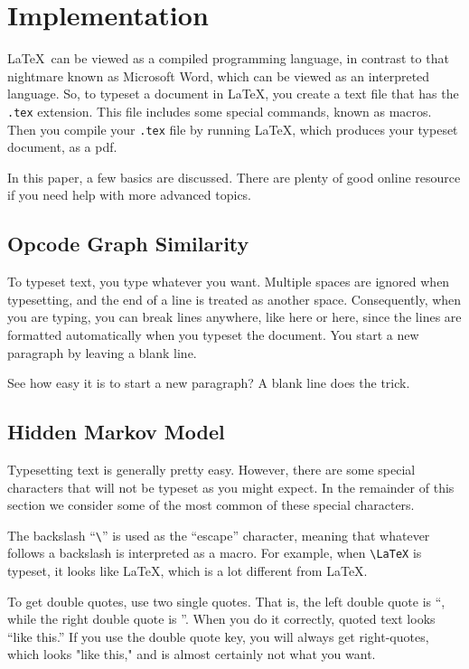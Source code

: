 \chapter{Implementation}

\LaTeX\ can be viewed
as a compiled programming language, in contrast to that 
nightmare known as Microsoft Word,
which can be viewed as an interpreted language. So, to typeset a
document in \LaTeX, you create a text file that has the {\tt .tex} extension.
This file includes some special
commands, known as macros. Then
you compile your {\tt .tex} file by running  \LaTeX,
which produces your typeset document, as a pdf. 

In this paper, a few basics are discussed. There are plenty of good online resource
if you need help with more advanced topics.


\section{Opcode Graph Similarity} 

To typeset text, you type whatever you want. Multiple spaces are
ignored                           when typesetting, and
the end of a line is treated as another space.
Consequently, when you are typing, you can break lines anywhere, like here
or here,
since the lines are formatted automatically when you typeset the document.
You start a new paragraph by leaving a blank line.

See how easy it is to start a new paragraph? A blank line does the trick.


\section{Hidden Markov Model}

Typesetting text is generally pretty easy. However, there are some special
characters that will not be typeset as you might expect. In the remainder of this
section we consider some of the most common of these
special characters. 

The backslash ``\verb+\+'' is used 
as the ``escape'' character, meaning that
whatever follows a backslash is interpreted as a macro.
For example, when \verb+\LaTeX+ is typeset, it looks like \LaTeX, which 
is a lot different from LaTeX.

To get double quotes, use two single quotes. That is, the left double quote is ``, while the right double
quote is ''. When you do it correctly, quoted text looks ``like this.''
If you use the double quote key, you will always get right-quotes, which looks "like this," and is
almost certainly not what you want.

